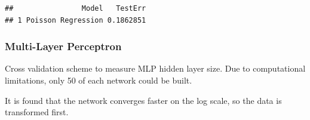 \begin{verbatim}
##                Model   TestErr
## 1 Poisson Regression 0.1862851
\end{verbatim}

\hypertarget{multi-layer-perceptron}{%
\subsubsection{Multi-Layer Perceptron}\label{multi-layer-perceptron}}

Cross validation scheme to measure MLP hidden layer size. Due to
computational limitations, only 50 of each network could be built.

It is found that the network converges faster on the log scale, so the
data is transformed first.

\begin{Shaded}
\begin{Highlighting}[]
\OtherTok{\textless{}{-}} 
\OtherTok{\textless{}{-}} 
\OtherTok{\textless{}{-}} 
\OtherTok{\textless{}{-}} 

 \NormalTok{(}\NormalTok{,}\NormalTok{,}\NormalTok{,}\NormalTok{,}\NormalTok{))\{}

   \SpecialCharTok{:}
\OtherTok{\textless{}{-}}\NormalTok{ eq[}\NormalTok{(}\NormalTok{(eq)), ]}

\OtherTok{\textless{}{-}}  \SpecialCharTok{*} 
\OtherTok{\textless{}{-}}\NormalTok{ df[}\SpecialCharTok{:}\NormalTok{train\_test\_split,]}
\OtherTok{\textless{}{-}}\NormalTok{ df[(train\_test\_split}\SpecialCharTok{+}\NormalTok{)}\SpecialCharTok{:} \NormalTok{(df),]}

\SpecialCharTok{$}\OtherTok{\textless{}{-}} \SpecialCharTok{$}


\end{Highlighting}
\end{Shaded}
